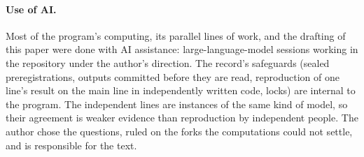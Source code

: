 \paragraph{Use of AI.} Most of the program's computing, its parallel lines of work, and the drafting of this paper were
done with AI assistance: large-language-model sessions working in the repository under the author's direction. The
record's safeguards (sealed preregistrations, outputs committed before they are read, reproduction of one line's result
on the main line in independently written code, locks) are internal to the program. The independent lines are
instances of the same kind of model, so their agreement is weaker evidence than reproduction by independent people. The
author chose the questions, ruled on the forks the computations could not settle, and is responsible for the text.


